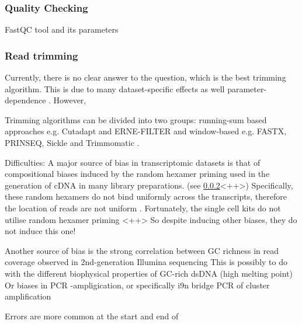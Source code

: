 \subsubsection{Quality Checking}

FastQC tool and its parameters

\subsubsection{Read trimming}



Currently, there is no clear answer to the question, which is the best trimming algorithm.
This is due to many dataset-specific effects as well parameter-dependence \citep{DelFabbro2013}.
However, 



Trimming algorithms can be divided into two groups: running-sum based approaches e.g. Cutadapt and ERNE-FILTER
and window-based e.g. FASTX, PRINSEQ, Sickle and Trimmomatic \citep{DelFabbro2013}.












Difficulties: 
A major source of bias in transcriptomic datasets is that of compositional biases induced
by the random hexamer priming used in the generation of cDNA in many library preparations.
(see \ref{}<++>) %
Specifically, these random hexamers do not bind uniformly across the transcripts,
therefore the location of reads are not uniform \citep{Hansen2010}\citep{Hansen2010}.
Fortunately, the single cell kits do not utilise random hexamer priming {}<++> %
So despite inducing other biases, they do not induce this one!


Another source of bias is the strong correlation between GC richness in read coverage
observed in 2nd-generation Illumina sequencing \citep{Dohm2008,}
This is possibly to do with the different biophysical properties of GC-rich dsDNA (high melting point) \citep{Dohm2008} %
Or biases in PCR -ampligication, or specifically i9n bridge PCR of cluster amplification


Errors are more common at the start and end of 




